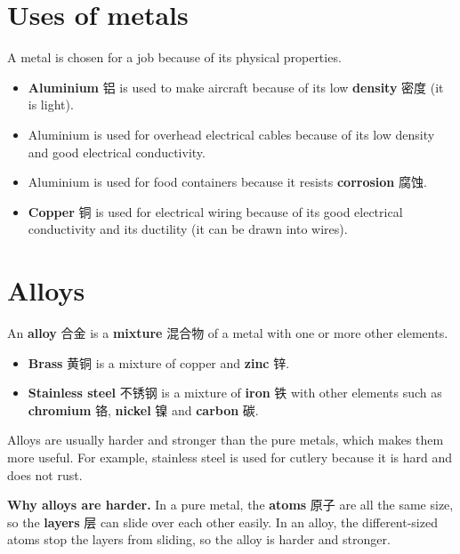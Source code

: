 \documentclass[11pt]{article}
\begin{document}
\section*{Uses of metals}

A metal is chosen for a job because of its physical properties.

\begin{itemize}
\item \textbf{Aluminium} 铝 is used to make aircraft because of its low \textbf{density} 密度 (it is light).

\item Aluminium is used for overhead electrical cables because of its low density and good electrical conductivity.

\item Aluminium is used for food containers because it resists \textbf{corrosion} 腐蚀.

\item \textbf{Copper} 铜 is used for electrical wiring because of its good electrical conductivity and its ductility (it can be drawn into wires).

\end{itemize}

\section*{Alloys}

An \textbf{alloy} 合金 is a \textbf{mixture} 混合物 of a metal with one or more other elements.

\begin{itemize}
\item \textbf{Brass} 黄铜 is a mixture of copper and \textbf{zinc} 锌.

\item \textbf{Stainless steel} 不锈钢 is a mixture of \textbf{iron} 铁 with other elements such as \textbf{chromium} 铬, \textbf{nickel} 镍 and \textbf{carbon} 碳.

\end{itemize}

Alloys are usually harder and stronger than the pure metals, which makes them more useful. For example, stainless steel is used for cutlery because it is hard and does not rust.

\textbf{Why alloys are harder.} In a pure metal, the \textbf{atoms} 原子 are all the same size, so the \textbf{layers} 层 can slide over each other easily. In an alloy, the different-sized atoms stop the layers from sliding, so the alloy is harder and stronger.
\end{document}
